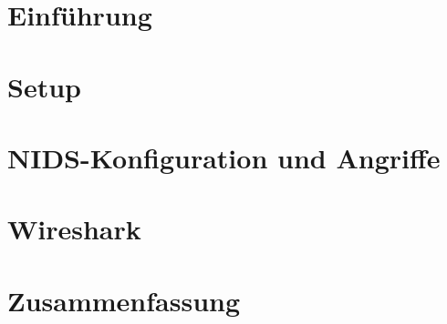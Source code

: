 \documentclass[10pt, a4paper]{article}
\begin{document}

\pagebreak

\newpage
  \tableofcontents
\newpage

\section{Einführung}


\section{Setup}


\section{NIDS-Konfiguration und Angriffe}


\section{Wireshark}


\section{Zusammenfassung}


\begin{refsection}
\nocite{*}
\printbibliography[heading=subbibliography,title={Referenzen}]
\end{refsection}
\end{document}
